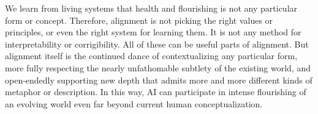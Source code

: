 \documentclass[12pt]{article}
\begin{document}



We learn from living systems that health and flourishing is not any particular form or concept. Therefore, alignment is not picking the right values or principles, or even the right system for learning them. It is not any method for interpretability or corrigibility. All of these can be useful parts of alignment. But alignment itself is the continued dance of contextualizing any particular form, more fully respecting the nearly unfathomable subtlety of the existing world, and open-endedly supporting new depth that admits more and more different kinds of metaphor or description. In this way, AI can participate in intense flourishing of an evolving world even far beyond current human conceptualization.







\end{document}
